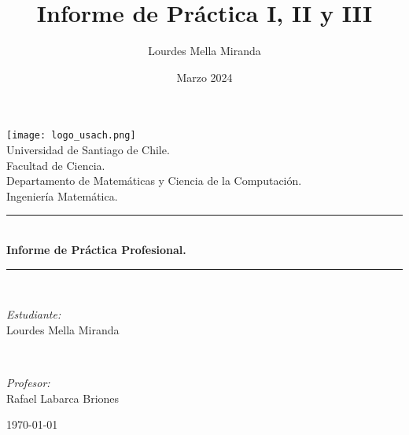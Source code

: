 \documentclass{article}
\title{Informe de Práctica I, II y III}
\author{Lourdes Mella Miranda}
\date{Marzo 2024}
\begin{document}
\begin{titlepage}
\begin{center}

\texttt{[image: logo\_usach.png]}\\[1cm]


{\large Universidad de Santiago de Chile.}\\[0.5cm]
{\large Facultad de Ciencia.}\\[0.5cm]
{\large Departamento de Matemáticas y Ciencia de la Computación.}\\[0.5cm]

{\large Ingeniería Matemática.}\\[0.5cm]

\rule{\linewidth}{0.5mm} \\[0.4cm]
{ \huge \bfseries Informe de Práctica Profesional. \\[0.4cm] }
\rule{\linewidth}{0.5mm} \\[1.5cm]

\noindent
\begin{minipage}{0.4\textwidth}
  \begin{flushleft} \large
  \end{flushleft}
\end{minipage}%
\begin{minipage}{0.4\textwidth}
  \begin{flushright} \large
    \emph{Estudiante:} \\
   Lourdes Mella Miranda
  \end{flushright}
\end{minipage}
\\

\vspace{1cm}

\noindent
\begin{minipage}{0.4\textwidth}
  \begin{flushleft} \large
  \end{flushleft}
\end{minipage}%
\begin{minipage}{0.4\textwidth}
  \begin{flushright} \large
    \emph{Profesor:} \\
   Rafael Labarca Briones
  \end{flushright}
\end{minipage}

\vfill

{\large \today}
\end{center}
\end{titlepage}
\end{document}
